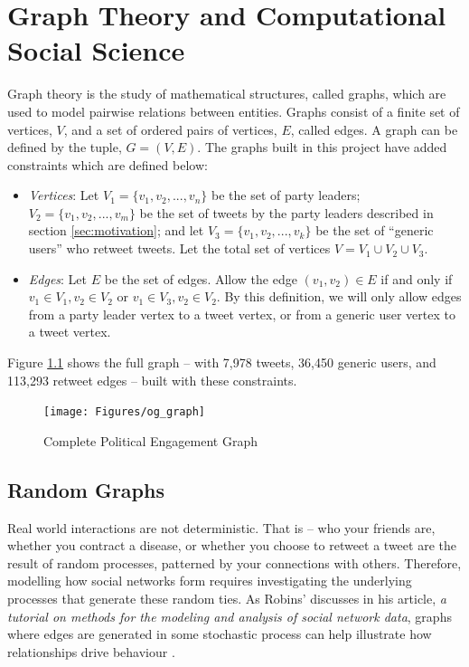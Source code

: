 \chapter{Graph Theory and Computational Social Science}\label{ch:GraphTheory}

Graph theory is the study of mathematical structures, called graphs, which are
used to model pairwise relations between entities. Graphs consist of a finite
set of vertices, $V$, and a set of ordered pairs of vertices, $E$, called edges.
A graph can be defined by the tuple, $G=(V,E)$. The graphs built in this project
have added constraints which are defined below:

\begin{itemize}
    \item \emph{Vertices}: Let $V_{1}=\{v_{1},v_{2},...,v_{n}\}$ be the set of
    party leaders; $V_{2}=\{v_{1},v_{2},...,v_{m}\}$ be the set of tweets by the
    party leaders described in section \ref{sec:motivation}; and let
    $V_{3}=\{v_{1},v_{2},...,v_{k}\}$ be the set of ``generic users'' who
    retweet tweets. Let the total set of vertices $V=V_{1}\cup V_{2}\cup V_{3}$.
    
    \item \emph{Edges}: Let $E$ be the set of edges. Allow the edge $(v_{1},
    v_{2})\in E$ if and only if $v_{1}\in V_{1}, v_{2}\in V_{2}$ or $v_{1}\in
    V_{3}, v_{2}\in V_{2}$. By this definition, we will only allow edges from a
    party leader vertex to a tweet vertex, or from a generic user vertex to a
    tweet vertex.
\end{itemize}

Figure \ref{fig:og_graph} shows the full graph -- with 7,978 tweets, 36,450
generic users, and 113,293 retweet edges --  built with these constraints.

\begin{singlespacing}
    \begin{figure}[H]
    \centering
    \texttt{[image: Figures/og\_graph]}
    \caption[Complete Political Engagement Graph]{Complete Political Engagement Graph}
    \label{fig:og_graph}
    \end{figure}
\end{singlespacing}

\section{Random Graphs}\label{sec:RandomGraphs}
    
Real world interactions are not deterministic. That is -- who your friends are,
whether you contract a disease, or whether you choose to retweet a tweet are the
result of random processes, patterned by your connections with others.
Therefore, modelling how social networks form requires investigating the
underlying processes that generate these random ties. As Robins'
discusses in his article,\emph{ a tutorial on methods for the modeling and
analysis of social network data}, graphs where edges are generated in some
stochastic process can help illustrate how relationships drive behaviour
\cite{robins2013tutorial}.  

